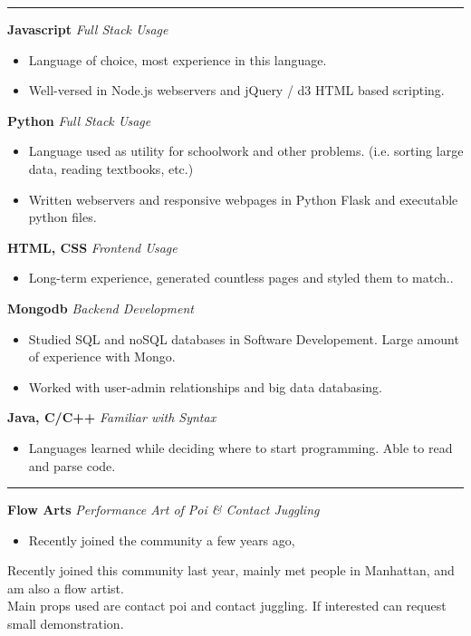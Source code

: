 \documentclass[14]{article}
\begin{document}
  \vspace{0.1cm} \hrule \vspace{0.3cm}
  \noindent
  \textbf{Javascript} \textit{Full Stack Usage}
  \begin{itemize}[label={--},noitemsep, topsep=0pt]
    \item Language of choice, most experience in this language.
    \item Well-versed in Node.js webservers and jQuery / d3 HTML based scripting.
  \end{itemize}
  \textbf{Python}\textit{ Full Stack Usage}
  \begin{itemize}[label={--},noitemsep, topsep=0pt]
    \item Language used as utility for schoolwork and other problems. (i.e. sorting large data, reading textbooks, etc.)
    \item Written webservers and responsive webpages in Python Flask and executable python files.
  \end{itemize}
  \textbf{HTML, CSS} \textit{ Frontend Usage}
  \begin{itemize}[label={--},noitemsep, topsep=0pt]
    \item Long-term experience, generated countless pages and styled them to match..
  \end{itemize}
  \textbf{Mongodb}\textit{ Backend Development}
  \begin{itemize}[label={--},noitemsep, topsep=0pt]
    \item Studied SQL and noSQL databases in Software Developement. Large amount of experience with Mongo.
    \item Worked with user-admin relationships and big data databasing.
  \end{itemize}
  \textbf{ Java, C/C++} \textit{ Familiar with Syntax}
  \begin{itemize}[label={--},noitemsep, topsep=0pt]
    \item Languages learned while deciding where to start programming. Able to read and parse code.
  \end{itemize}

  \vspace{0.1cm} \hrule \vspace{0.3cm}
  \noindent\textbf{Flow Arts}\textit{ Performance Art of Poi \& Contact Juggling}
  \begin{itemize}[label={--},noitemsep, topsep=0pt]
    \item Recently joined the community a few years ago,
  \end{itemize}
  Recently joined this community last year, mainly met people in Manhattan, and am also a flow artist.\\
  Main props used are contact poi and contact juggling. If interested can request small demonstration.
\end{document}
